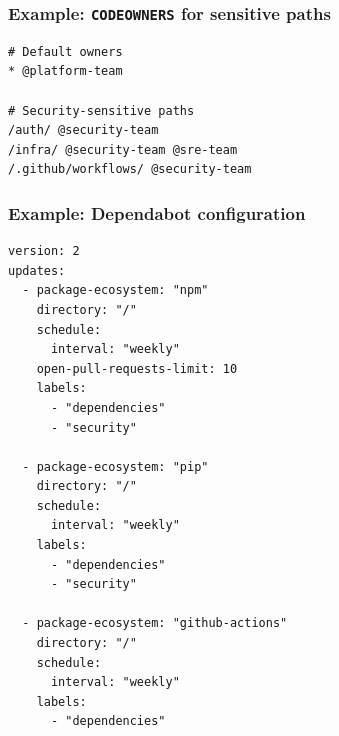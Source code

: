 \documentclass[11pt]{article}
\begin{document}
\subsubsection{Example: \texttt{CODEOWNERS} for sensitive paths}
\begin{examplebox}[title={Require security review for high-risk code paths using \texttt{CODEOWNERS}}]
\begin{verbatim}
# Default owners
* @platform-team

# Security-sensitive paths
/auth/ @security-team
/infra/ @security-team @sre-team
/.github/workflows/ @security-team
\end{verbatim}
\end{examplebox}

\subsubsection{Example: Dependabot configuration}
\begin{examplebox}[title={Example: \texttt{.github/dependabot.yml}}]
\begin{verbatim}
version: 2
updates:
  - package-ecosystem: "npm"
    directory: "/"
    schedule:
      interval: "weekly"
    open-pull-requests-limit: 10
    labels:
      - "dependencies"
      - "security"

  - package-ecosystem: "pip"
    directory: "/"
    schedule:
      interval: "weekly"
    labels:
      - "dependencies"
      - "security"

  - package-ecosystem: "github-actions"
    directory: "/"
    schedule:
      interval: "weekly"
    labels:
      - "dependencies"
\end{verbatim}
\end{examplebox}
\end{document}
